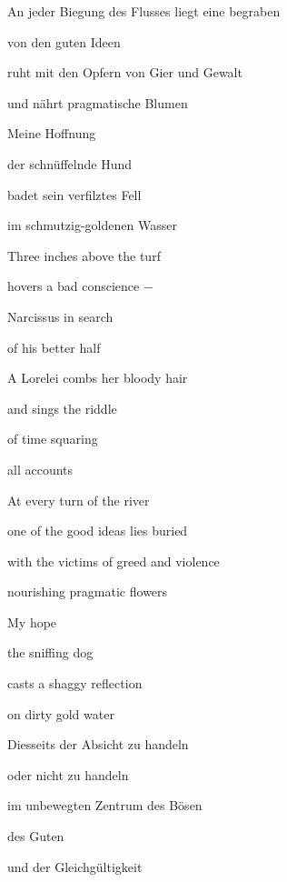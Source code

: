 \documentclass[a4paper]{article}
\begin{document}
An jeder Biegung des Flusses liegt eine begraben

von den guten Ideen

ruht mit den Opfern von Gier und Gewalt

und nährt pragmatische Blumen


\bigskip

Meine Hoffnung

der schnüffelnde Hund

badet sein verfilztes Fell

im schmutzig-goldenen Wasser


\bigskip


\bigskip



\bigskip

Three inches above the turf

hovers a bad conscience $-$

Narcissus in search

of his better half


\bigskip

A Lorelei combs her bloody hair

and sings the riddle

of time squaring 

all accounts


\bigskip

At every turn of the river

one of the good ideas lies buried

with the victims of greed and violence

nourishing pragmatic flowers


\bigskip

My hope

the sniffing dog

casts a shaggy reflection 

on dirty gold water


\bigskip


\bigskip


\bigskip



\bigskip

Diesseits der Absicht zu handeln

oder nicht zu handeln

im unbewegten Zentrum des Bösen

des Guten

und der Gleichgültigkeit
\end{document}
